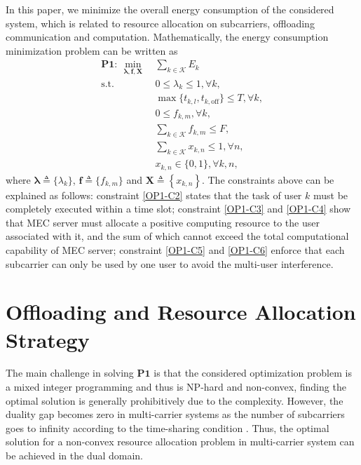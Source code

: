 \documentclass[journal]{IEEEtran}
\begin{document}
In this paper, we minimize the overall energy consumption of the considered system, which is related to resource allocation on subcarriers, offloading communication and computation. Mathematically, the energy consumption minimization problem can be written as 
\begin{subequations}\label{OP1}
\begin{align}
\mathbf{P1}:~\min _{\boldsymbol{\lambda},\boldsymbol{f},\boldsymbol{X}}~&\sum_{k\in\mathcal{K}}E_{k}\\
\mathrm{s.t.}  ~& 0\leq \lambda_{k}\leq 1,\forall k, \label{OP1-C1}\\
~&  \max \{t_{k,l}, t_{k,\text{off}}\} \leq T,\forall k,\label{OP1-C2}\\
~&  0 \leq f_{k,m}, \forall k,\label{OP1-C3}\\
~& \sum_{k\in\mathcal{K}}f_{k,m}\leq F,\label{OP1-C4}\\
~& \sum_{k\in\mathcal{K}}x_{k, n} \leq 1, \forall n,\label{OP1-C5}\\
~&  x_{k, n} \in\{0,1\},\forall k, n,\label{OP1-C6}
\end{align}
\end{subequations}
where $\boldsymbol{\lambda}\triangleq\{\lambda_{k}\}$, $\boldsymbol{f}\triangleq\{f_{k,m}\}$ and $\boldsymbol{X}\triangleq\left\{x_{k,n}\right\}$. The constraints above can be explained as follows: constraint \eqref{OP1-C2} states that the task of user $k$ must be completely executed within a time slot; constraint \eqref{OP1-C3} and \eqref{OP1-C4} show that MEC server must allocate a positive computing resource to the user associated with it, and the sum of which cannot exceed the total computational capability of MEC server; constraint \eqref{OP1-C5} and \eqref{OP1-C6} enforce that each subcarrier can only be used by one user to avoid the multi-user interference.
\section{Offloading and Resource Allocation Strategy}
The main challenge in solving $\mathbf{P1}$ is that the considered optimization problem is a mixed integer programming and thus is NP-hard and non-convex, finding the optimal solution is generally prohibitively due to the complexity. However, the duality gap becomes zero in multi-carrier systems as the number of subcarriers goes to infinity according to the time-sharing condition \cite{Seong2006Optimal,Wei2006Dual}. Thus, the optimal solution for a non-convex resource allocation problem in multi-carrier system can be achieved in the dual domain. 
\end{document}
